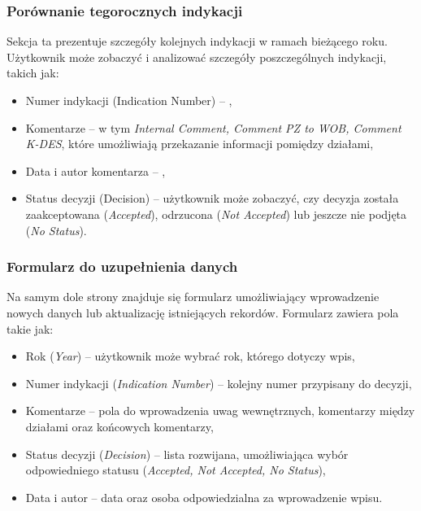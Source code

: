 \subsubsection{Porównanie tegorocznych indykacji}
Sekcja ta prezentuje szczegóły kolejnych indykacji w ramach bieżącego roku. Użytkownik może zobaczyć i analizować szczegóły poszczególnych indykacji, takich jak:
\begin{itemize}
    \item {Numer indykacji (Indication Number)} -- ,
    \item {Komentarze} -- w tym \textit{Internal Comment, Comment PZ to WOB, Comment K-DES}, które umożliwiają przekazanie informacji pomiędzy działami,
    \item {Data i autor komentarza} -- ,
    \item {Status decyzji (Decision)} -- użytkownik może zobaczyć, czy decyzja została zaakceptowana (\textit{Accepted}), odrzucona (\textit{Not Accepted}) lub jeszcze nie podjęta (\textit{No Status}).
\end{itemize}

\subsubsection{Formularz do uzupełnienia danych}
Na samym dole strony znajduje się formularz umożliwiający wprowadzenie nowych danych lub aktualizację istniejących rekordów. Formularz zawiera pola takie jak:
\begin{itemize}
    \item {Rok (\textit{Year})} -- użytkownik może wybrać rok, którego dotyczy wpis,
    \item {Numer indykacji (\textit{Indication Number})} -- kolejny numer przypisany do decyzji,
    \item {Komentarze} -- pola do wprowadzenia uwag wewnętrznych, komentarzy między działami oraz końcowych komentarzy,
    \item {Status decyzji (\textit{Decision})} -- lista rozwijana, umożliwiająca wybór odpowiedniego statusu (\textit{Accepted, Not Accepted, No Status}),
    \item {Data i autor} -- data oraz osoba odpowiedzialna za wprowadzenie wpisu.
\end{itemize}

